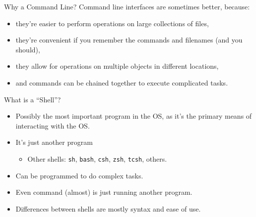 \documentclass[graphics]{beamer}
\begin{document}
\begin{frame}{Why a Command Line?}
    Command line interfaces are sometimes better, because:
    \begin{itemize}
        \item they're easier to perform operations on large collections of files,
        \item they're convenient if you remember the commands and filenames (and you should),
        \item they allow for operations on multiple objects in different locations,
        \item and commands can be chained together to execute complicated tasks.
    \end{itemize}
\end{frame}

\begin{frame}{What is a ``Shell''?}
    \begin{itemize}
        \item Possibly the most important program in the OS, as it's the primary means of interacting with the OS.
        \item It's just another program
        \begin{itemize}
            \item Other shells: \texttt{sh}, \texttt{bash}, \texttt{csh}, \texttt{zsh}, \texttt{tcsh}, others.
        \end{itemize}
        \item Can be programmed to do complex tasks.
        \item Even command (almost) is just running another program.
        \item Differences between shells are mostly syntax and ease of use.
    \end{itemize}
\end{frame}
\end{document}
